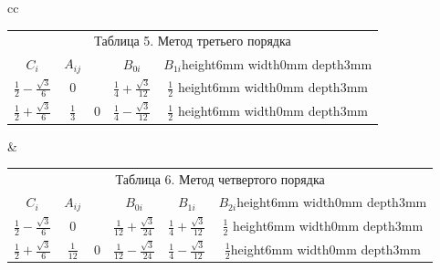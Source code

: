 \begin{center}


\begin{tabular}{cc}





\begin{tabular}{c|cc|cc}


\multicolumn{5}{c}{Таблица 5. Метод третьего порядка}\\


$C_{i}$ & $A_{ij}$ & \ & $B_{0i}$ &


$B_{1i}$\vrule height6mm width0mm depth3mm \\


\hline


$\frac12 -\frac{\sqrt{3}}{6}$ & 0 & & $\frac14+\frac{\sqrt{3}}{12}$ &


$\frac12$ \vrule height6mm width0mm depth3mm\\


$\frac12 +\frac{\sqrt{3}}{6}$ & $\frac13$ & 


0 & $\frac14 -\frac{\sqrt{3}}{12}$& $\frac12$ \vrule height6mm width0mm depth3mm\\


\end{tabular}


&


\begin{tabular}{c|cc|ccc}


\multicolumn{6}{c}{Таблица 6. Метод четвертого порядка}\\


$C_{i}$ & $A_{ij}$ & & $B_{0i}$& $B_{1i}$&


$B_{2i}$\vrule height6mm width0mm depth3mm \\


\hline


$\frac12 -\frac{\sqrt{3}}{6}$ & 0 & &$\frac{1}{12}+\frac{\sqrt{3}}{24}$&


$\frac14 +\frac{\sqrt{3}}{12}$ & $\frac12$ \vrule height6mm width0mm depth3mm\\


$\frac12+\frac{\sqrt{3}}{6}$ & $\frac{1}{12}$ & 0 


& $\frac{1}{12}-\frac{\sqrt{3}}{24}$ & 


$\frac14-\frac{\sqrt{3}}{12}$ & $\frac12$\vrule height6mm width0mm depth3mm


\end{tabular}


\end{tabular}


\end{center}


